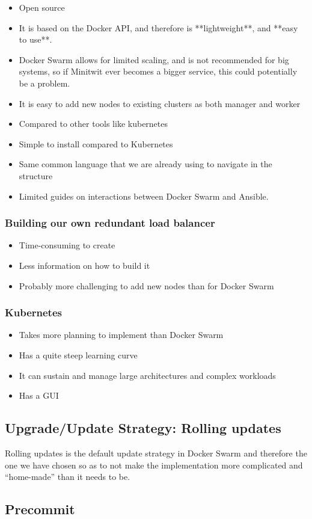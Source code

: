 \cite{ansible:dockerswarm}
\begin{itemize}
    \item Open source
    \item It is based on the Docker API, and therefore is **lightweight**, and **easy to use**.
    \item Docker Swarm allows for limited scaling, and is not recommended for big systems, so if Minitwit ever becomes a bigger service, this could potentially be a problem.
    \item It is easy to add new nodes to existing clusters as both manager and worker
    \item Compared to other tools like kubernetes
    \item Simple to install compared to Kubernetes
    \item Same common language that we are already using to navigate in the structure
    \item Limited guides on interactions between Docker Swarm and Ansible.
\end{itemize}

\subsubsection{Building our own redundant load balancer}
\begin{itemize}
    \item Time-consuming to create
    \item Less information on how to build it
    \item Probably more challenging to add new nodes than for Docker Swarm
\end{itemize}

\subsubsection{Kubernetes}
\begin{itemize}
    \item Takes more planning to implement than Docker Swarm
    \item Has a quite steep learning curve
    \item It can sustain and manage large architectures and complex workloads
    \item Has a GUI
\end{itemize}

\subsection{Upgrade/Update Strategy: Rolling updates}

Rolling updates is the default update strategy in Docker Swarm and therefore the one we have chosen so as to not make the implementation more complicated and “home-made” than it needs to be.

\subsection{Precommit}
